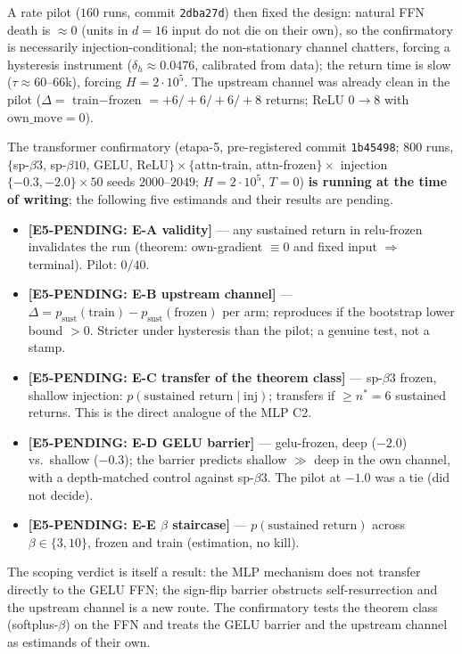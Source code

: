 \documentclass[11pt]{article}
\begin{document}
A rate pilot ($160$ runs, commit \texttt{2dba27d}) then fixed the design: natural
FFN death is $\approx0$ (units in $d=16$ input do not die on their own), so the
confirmatory is necessarily injection-conditional; the non-stationary channel
chatters, forcing a hysteresis instrument ($\delta_h\approx0.0476$, calibrated
from data); the return time is slow ($\tau\approx60$--$66$k), forcing $H=2\cdot10^5$.
The upstream channel was already clean in the pilot ($\Delta=$ train$-$frozen
$=+6/+6/+6/+8$ returns; ReLU $0\to8$ with $\mathrm{own\_move}=0$).

The transformer confirmatory (etapa-5, pre-registered commit \texttt{1b45498};
$800$ runs, $\{$sp-$\beta3$, sp-$\beta10$, GELU, ReLU$\}\times\{$attn-train,
attn-frozen$\}\times$ injection $\{-0.3,-2.0\}\times50$ seeds $2000$--$2049$;
$H=2\cdot10^5$, $T=0$) \textbf{is running at the time of writing}; the following
five estimands and their results are pending.

\begin{itemize}
\item \textbf{[E5-PENDING: E-A validity]} --- any sustained return in
relu-frozen invalidates the run (theorem: own-gradient $\equiv0$ and fixed input
$\Rightarrow$ terminal). Pilot: $0/40$.
\item \textbf{[E5-PENDING: E-B upstream channel]} ---
$\Delta=p_{\mathrm{sust}}(\text{train})-p_{\mathrm{sust}}(\text{frozen})$ per arm;
reproduces if the bootstrap lower bound $>0$. Stricter under hysteresis than the
pilot; a genuine test, not a stamp.
\item \textbf{[E5-PENDING: E-C transfer of the theorem class]} --- sp-$\beta3$
frozen, shallow injection: $p(\text{sustained return}\mid\text{inj})$; transfers
if $\ge n^\ast=6$ sustained returns. This is the direct analogue of the MLP C2.
\item \textbf{[E5-PENDING: E-D GELU barrier]} --- gelu-frozen, deep ($-2.0$) vs.\
shallow ($-0.3$); the barrier predicts shallow $\gg$ deep in the own channel,
with a depth-matched control against sp-$\beta3$. The pilot at $-1.0$ was a tie
(did not decide).
\item \textbf{[E5-PENDING: E-E $\beta$ staircase]} --- $p(\text{sustained
return})$ across $\beta\in\{3,10\}$, frozen and train (estimation, no kill).
\end{itemize}

The scoping verdict is itself a result: the MLP mechanism does not transfer
directly to the GELU FFN; the sign-flip barrier obstructs self-resurrection and
the upstream channel is a new route. The confirmatory tests the theorem class
(softplus-$\beta$) on the FFN and treats the GELU barrier and the upstream
channel as estimands of their own.
\end{document}
